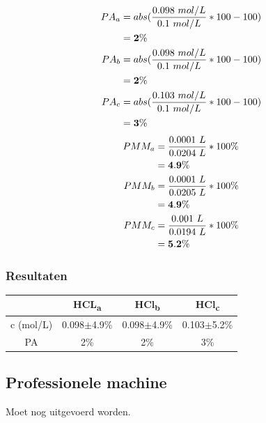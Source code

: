 \documentclass[10pt,twoside]{report}
\begin{document}
\begin{multicols}{2}
    \begin{equation*}
        \begin{split}
            PA_a &= abs(\frac{0.098\ mol/L}{0.1\ mol/L}*100-100)\\
                &= \bold{2\%} \\
            PA_b &= abs(\frac{0.098\ mol/L}{0.1\ mol/L}*100-100)\\
                &= \bold{2\%} \\
            PA_c &= abs(\frac{0.103\ mol/L}{0.1\ mol/L}*100-100)\\
                &= \bold{3\%} \\
        \end{split}
    \end{equation*}
\break
    \begin{equation*}
        \begin{split}
            PMM_a &= \frac{0.0001\ L}{0.0204\ L}*100\%\\
                &= \bold{4.9\%}\\
            PMM_b &= \frac{0.0001\ L}{0.0205\ L}*100\%\\
                &= \bold{4.9\%}\\
            PMM_c &= \frac{0.001\ L}{0.0194\ L}*100\%\\
                &= \bold{5.2\%}\\
        \end{split}
    \end{equation*}
\end{multicols}

\subsubsection{Resultaten}
\begin{tabular}{|c|c|c|c|}
    \hline
    & HCL\textsubscript{a} & HCl\textsubscript{b} & HCl\textsubscript{c} \\\hline
    c (mol/L) & 0.098$\pm$4.9\% & 0.098$\pm$4.9\% & 0.103$\pm$5.2\% \\\hline
    PA  & 2\% & 2\% & 3\% \\\hline
\end{tabular}

\newpage

\subsection{Professionele machine}
Moet nog uitgevoerd worden.
\end{document}
